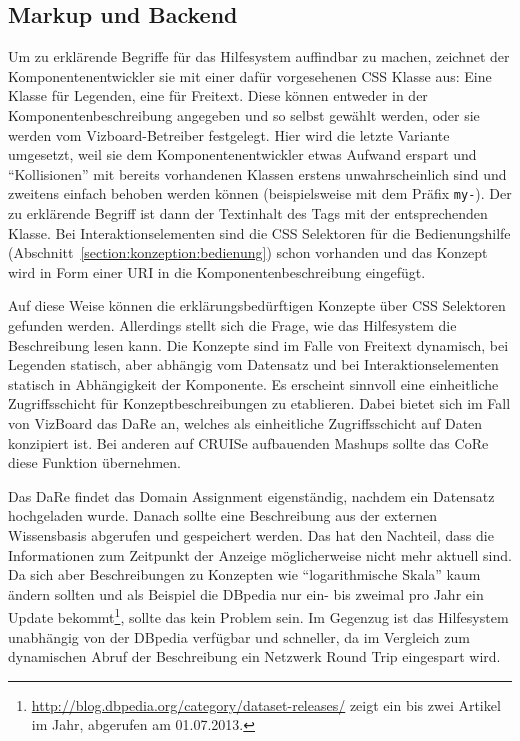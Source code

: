 \documentclass[
	headsepline,
	footsepline,
	fontsize=12pt,
	bibliography=totoc
]{scrbook}
\begin{document}
\subsection{Markup und Backend}
\label{section:konzeption:verlinkung:backend}

Um zu erklärende Begriffe für das Hilfesystem auffindbar zu machen, zeichnet der Komponentenentwickler sie mit einer dafür vorgesehenen CSS Klasse aus: Eine Klasse für Legenden, eine für Freitext. Diese können entweder in der Komponentenbeschreibung angegeben und so selbst gewählt werden, oder sie werden vom Vizboard-Betreiber festgelegt. Hier wird die letzte Variante umgesetzt, weil sie dem Komponentenentwickler etwas Aufwand erspart und \enquote{Kollisionen} mit bereits vorhandenen Klassen erstens unwahrscheinlich sind und zweitens einfach behoben werden können (beispielsweise mit dem Präfix \texttt{my-}). Der zu erklärende Begriff ist dann der Textinhalt des Tags mit der entsprechenden Klasse. Bei Interaktionselementen sind die CSS Selektoren für die Bedienungshilfe (Abschnitt~\ref{section:konzeption:bedienung}) schon vorhanden und das Konzept wird in Form einer URI in die Komponentenbeschreibung eingefügt.

Auf diese Weise können die erklärungsbedürftigen Konzepte über CSS Selektoren gefunden werden. Allerdings stellt sich die Frage, wie das Hilfesystem die Beschreibung lesen kann. Die Konzepte sind im Falle von Freitext dynamisch, bei Legenden statisch, aber abhängig vom Datensatz und bei Interaktionselementen statisch in Abhängigkeit der Komponente. Es erscheint sinnvoll eine einheitliche Zugriffsschicht für Konzeptbeschreibungen zu etablieren. Dabei bietet sich im Fall von VizBoard das DaRe an, welches als einheitliche Zugriffsschicht auf Daten konzipiert ist. Bei anderen auf CRUISe aufbauenden Mashups sollte das CoRe diese Funktion übernehmen.

Das DaRe findet das Domain Assignment eigenständig, nachdem ein Datensatz hochgeladen wurde. Danach sollte eine Beschreibung aus der externen Wissensbasis abgerufen und gespeichert werden. Das hat den Nachteil, dass die Informationen zum Zeitpunkt der Anzeige möglicherweise nicht mehr aktuell sind. Da sich aber Beschreibungen zu Konzepten wie \enquote{logarithmische Skala} kaum ändern sollten und als Beispiel die DBpedia nur ein- bis zweimal pro Jahr ein Update bekommt\footnote{\url{http://blog.dbpedia.org/category/dataset-releases/} zeigt ein bis zwei Artikel im Jahr, abgerufen am 01.07.2013.}, sollte das kein Problem sein. Im Gegenzug ist das Hilfesystem unabhängig von der DBpedia verfügbar und schneller, da im Vergleich zum dynamischen Abruf der Beschreibung ein Netzwerk Round Trip eingespart wird.
\end{document}
